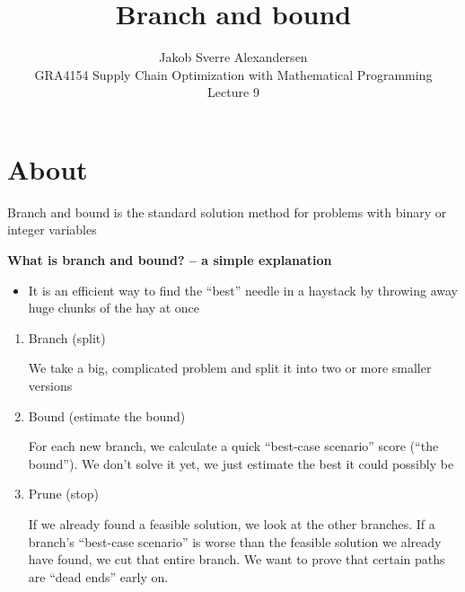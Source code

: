 \documentclass[10pt]{article}
\begin{document}
 
\title{Branch and bound}
\author{Jakob Sverre Alexandersen\\
GRA4154 Supply Chain Optimization with Mathematical Programming\\
Lecture 9}
\maketitle

\tableofcontents
\newpage
\section{About}
Branch and bound is the standard solution method for problems with binary or integer variables 

\textbf{What is branch and bound? -- a simple explanation}
\begin{itemize}
    \item It is an efficient way to find the ``best'' needle in a haystack by throwing away huge chunks of the hay at once 
\end{itemize}
\begin{enumerate}
    \item Branch (split)

    We take a big, complicated problem and split it into two or more smaller versions 
    \item Bound (estimate the bound)

    For each new branch, we calculate a quick ``best-case scenario'' score (``the bound''). We don't solve it yet, we just estimate the best it could possibly be 
    \item Prune (stop)

    If we already found a feasible solution, we look at the other branches. If a branch's ``best-case scenario'' is worse than the feasible solution we already have found, we cut that entire branch. We want to prove that certain paths are ``dead ends'' early on. 
\end{enumerate}
\end{document}
